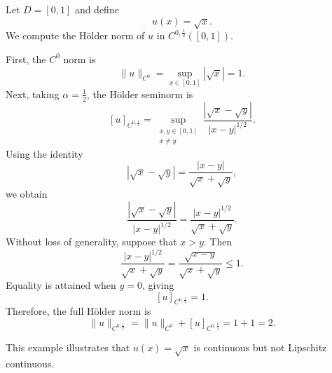 \begin{example}
    \label{ex:Holder-norm}

    Let $D=[0,1]$ and define
    \[
        u(x)=\sqrt{x}.
    \]
    We compute the H\"older norm of $u$ in
    $C^{0,\frac{1}{2}}([0,1])$.

    First, the $C^0$ norm is
    \[
        \|u\|_{C^0}
        =
        \sup_{x\in[0,1]}|\sqrt{x}|
        =
        1.
    \]
    Next, taking $\alpha=\frac{1}{2}$, the H\"older seminorm is
    \[
        [u]_{C^{0,\frac{1}{2}}}
        =
        \sup_{\substack{x,y\in[0,1]\\x\neq y}}
        \frac{|\sqrt{x}-\sqrt{y}|}{|x-y|^{1/2}}.
    \]
    Using the identity
    \[
        |\sqrt{x}-\sqrt{y}|
        =
        \frac{|x-y|}{\sqrt{x}+\sqrt{y}},
    \]
    we obtain
    \[
        \frac{|\sqrt{x}-\sqrt{y}|}{|x-y|^{1/2}}
        =
        \frac{|x-y|^{1/2}}{\sqrt{x}+\sqrt{y}}.
    \]
    Without loss of generality, suppose that $x>y$. Then
    \[
        \frac{|x-y|^{1/2}}{\sqrt{x}+\sqrt{y}}
        =
        \frac{\sqrt{x-y}}{\sqrt{x}+\sqrt{y}}
        \leq 1.
    \]
    Equality is attained when $y=0$, giving
    \[
        [u]_{C^{0,\frac{1}{2}}}=1.
    \]
    Therefore, the full H\"older norm is
    \[
        \|u\|_{C^{0,\frac{1}{2}}}
        =
        \|u\|_{C^0}
        +
        [u]_{C^{0,\frac{1}{2}}}
        =
        1+1
        =
        2.
    \]

    This example illustrates that $u(x)=\sqrt{x}$ is continuous but not Lipschitz continuous. 
\end{example}


